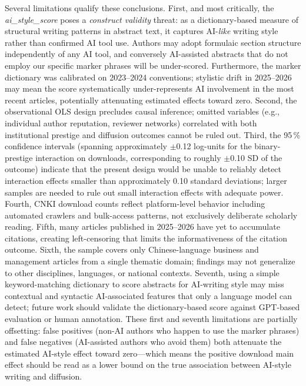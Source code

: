 \documentclass[12pt,a4paper]{article}
\begin{document}
Several limitations qualify these conclusions.
First, and most critically, the \textit{ai\_style\_score} poses a
\textit{construct validity} threat: as a dictionary-based measure
of structural writing patterns in abstract text,
it captures AI-\textit{like} writing style rather than confirmed
AI tool use.
Authors may adopt formulaic section structure independently of any AI
tool, and conversely AI-assisted abstracts that do not employ
our specific marker phrases will be under-scored.
Furthermore, the marker dictionary was calibrated on 2023--2024
conventions; stylistic drift in 2025--2026 may mean the score
systematically under-represents AI involvement in the most recent
articles, potentially attenuating estimated effects toward zero.
Second, the observational OLS design precludes causal inference;
omitted variables (e.g., individual author reputation, reviewer networks)
correlated with both institutional prestige and diffusion outcomes
cannot be ruled out.
Third, the 95\,\% confidence intervals (spanning approximately
$\pm$0.12 log-units for the binary-prestige interaction on downloads,
corresponding to roughly $\pm$0.10 SD of the outcome)
indicate that the present design would be unable to reliably detect
interaction effects smaller than approximately 0.10 standard deviations;
larger samples are needed to rule out small interaction effects with
adequate power.
Fourth, CNKI download counts reflect platform-level behavior including
automated crawlers and bulk-access patterns, not exclusively deliberate
scholarly reading.
Fifth, many articles published in 2025--2026 have yet to accumulate
citations, creating left-censoring that limits the informativeness of
the citation outcome.
Sixth, the sample covers only Chinese-language business and management
articles from a single thematic domain; findings may not generalize
to other disciplines, languages, or national contexts.
Seventh, using a simple keyword-matching dictionary to score abstracts
for AI-writing style may miss contextual and syntactic AI-associated
features that only a language model can detect; future work should
validate the dictionary-based score against GPT-based evaluation or
human annotation.
These first and seventh limitations are partially offsetting: false
positives (non-AI authors who happen to use the marker phrases) and
false negatives (AI-assisted authors who avoid them) both attenuate
the estimated AI-style effect toward zero---which means the positive
download main effect should be read as a lower bound on the true
association between AI-style writing and diffusion.
\end{document}
